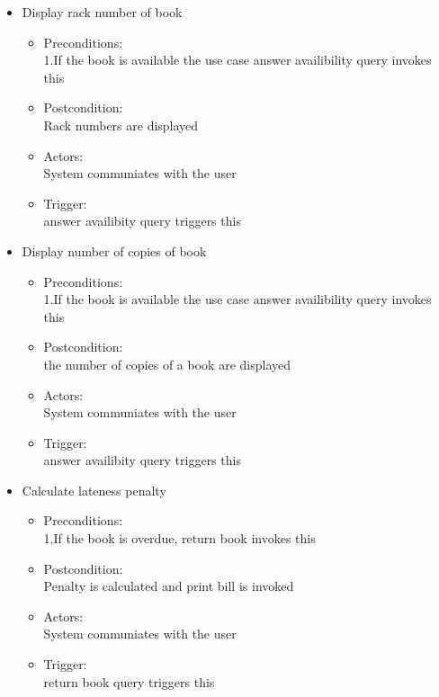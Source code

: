\documentclass{article}
\begin{document}
\begin{enumerate}
\begin{itemize}
\item Display rack number of book\\ 
	\begin{itemize}
	\item  Preconditions:\\ 1.If the book is available the use case answer availibility query invokes this\\ 
 \item Postcondition:\\  Rack numbers are displayed\\ 
 \item Actors:\\  System communiates with the user\\ 
 \item Trigger:\\  answer availibity query triggers this\\ 
	\end{itemize}
 
 \item Display number of copies of book\\ 
	\begin{itemize}
	\item  Preconditions:\\ 1.If the book is available the use case answer availibility query invokes this\\ 
 \item Postcondition:\\  the number of copies of a book are displayed\\ 
 \item Actors: \\ System communiates with the user\\ 
 \item Trigger:\\  answer availibity query triggers this\\ 
	\end{itemize}

\item Calculate lateness penalty\\ 
	\begin{itemize}
	\item  Preconditions:\\ 1.If the book is overdue, return book invokes this\\ 
 \item Postcondition:\\ Penalty is calculated and print bill is invoked\\ 
 \item Actors: \\ System communiates with the user\\ 
 \item Trigger: \\ return book query triggers this\\ 
	\end{itemize}
 

\end{itemize}
\end{enumerate}
\end{document}
